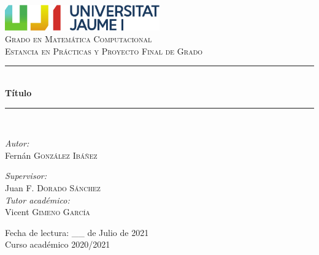 \documentclass[pdftex,11pt,a4paper]{book}
\newcommand{\HRule}{\rule{\linewidth}{0.5mm}}
\begin{document}
\begin{titlepage}
\begin{center}

\includegraphics[width=0.50\textwidth]{./logocolor.pdf}~\\[2cm]

\textsc{\LARGE Grado en Matemática Computacional}\\[1.5cm]

\textsc{\LARGE Estancia en Prácticas y Proyecto
 Final de Grado}\\[1.5cm]


\HRule \\[0.4cm]
{ \huge \bfseries Título \\[0.4cm] }

\HRule \\[1.5cm]


\begin{minipage}{0.4\textwidth}

\begin{flushleft} \large
\emph{Autor:}\\
Fernán \textsc{González Ibáñez}
\end{flushleft}
\end{minipage}
\begin{minipage}{0.4\textwidth}
\begin{flushright} \large
\emph{Supervisor:} \\
Juan F. \textsc{Dorado Sánchez  } \\
\emph{Tutor académico:} \\
Vicent \textsc{Gimeno García}
\end{flushright}

\end{minipage}

\vfill

{\large Fecha de lectura: \_\_ de Julio de 2021\\
Curso académico 2020/2021}

\end{center}
\end{titlepage}
\setlength{\parskip}{\baselineskip}



\end{document}
